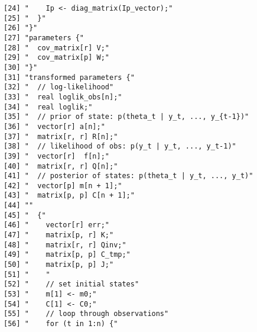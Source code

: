 \documentclass{article}\usepackage[]{graphicx}\usepackage[]{color}
\makeatletter
\newenvironment{kframe}{%
 \def\at@end@of@kframe{}%
 \ifinner\ifhmode%
  \def\at@end@of@kframe{\end{minipage}}%
  \begin{minipage}{\columnwidth}%
 \fi\fi%
 \def\FrameCommand##1{\hskip\@totalleftmargin \hskip-\fboxsep
 \colorbox{shadecolor}{##1}\hskip-\fboxsep
     \hskip-\linewidth \hskip-\@totalleftmargin \hskip\columnwidth}%
 \MakeFramed {\advance\hsize-\width
   \@totalleftmargin\z@ \linewidth\hsize
   \@setminipage}}%
 {\par\unskip\endMakeFramed%
 \at@end@of@kframe}
\newenvironment{knitrout}{}{} %
\makeatother
\begin{document}
\begin{knitrout}
\begin{kframe}
\begin{verbatim}
[24] "    Ip <- diag_matrix(Ip_vector);"                                       
[25] "  }"                                                                     
[26] "}"                                                                       
[27] "parameters {"                                                            
[28] "  cov_matrix[r] V;"                                                      
[29] "  cov_matrix[p] W;"                                                      
[30] "}"                                                                       
[31] "transformed parameters {"                                                
[32] "  // log-likelihood"                                                     
[33] "  real loglik_obs[n];"                                                   
[34] "  real loglik;"                                                          
[35] "  // prior of state: p(theta_t | y_t, ..., y_{t-1})"                     
[36] "  vector[r] a[n];"                                                       
[37] "  matrix[r, r] R[n];"                                                    
[38] "  // likelihood of obs: p(y_t | y_t, ..., y_t-1)"                        
[39] "  vector[r]  f[n];"                                                      
[40] "  matrix[r, r] Q[n];"                                                    
[41] "  // posterior of states: p(theta_t | y_t, ..., y_t)"                    
[42] "  vector[p] m[n + 1];"                                                   
[43] "  matrix[p, p] C[n + 1];"                                                
[44] ""                                                                        
[45] "  {"                                                                     
[46] "    vector[r] err;"                                                      
[47] "    matrix[p, r] K;"                                                     
[48] "    matrix[r, r] Qinv;"                                                  
[49] "    matrix[p, p] C_tmp;"                                                 
[50] "    matrix[p, p] J;"                                                     
[51] "    "                                                                    
[52] "    // set initial states"                                               
[53] "    m[1] <- m0;"                                                         
[54] "    C[1] <- C0;"                                                         
[55] "    // loop through observations"                                        
[56] "    for (t in 1:n) {"                                                    

\end{verbatim}
\end{kframe}
\end{knitrout}
\end{document}
